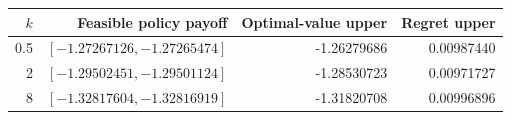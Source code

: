 \begin{tabular}{rrrr}
\toprule
$k$ & Feasible policy payoff & Optimal-value upper & Regret upper \\
\midrule
0.5 & $[-1.27267126,-1.27265474]$ & -1.26279686 & 0.00987440 \\
2 & $[-1.29502451,-1.29501124]$ & -1.28530723 & 0.00971727 \\
8 & $[-1.32817604,-1.32816919]$ & -1.31820708 & 0.00996896 \\
\bottomrule
\end{tabular}
